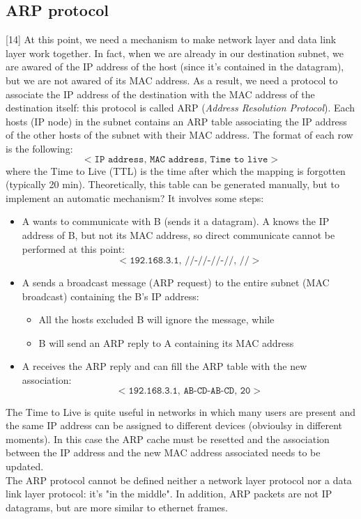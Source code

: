 \subsection{ARP protocol}
[14] At this point, we need a mechanism to make network layer and data link layer work together. In fact, when we are already in our destination subnet, we are awared of the IP address of the host (since it's contained in the datagram), but we are not awared of its MAC address. As a result, we need a protocol to associate the IP address of the destination with the MAC address of the destination itself: this protocol is called ARP (\textit{Address Resolution Protocol}). Each hosts (IP node) in the subnet contains an ARP table associating the IP address of the other hosts of the subnet with their MAC address. The format of each row is the following:
\[<\texttt{IP address, MAC address, Time to live}>\]
where the Time to Live (TTL) is the time after which the mapping is forgotten (typically 20 min). Theoretically, this table can be generated manually, but to implement an automatic mechanism? It involves some steps:
\begin{itemize}
    \item A wants to communicate with B (sends it a datagram). A knows the IP address of B, but not its MAC address, so direct communicate cannot be performed at this point:
    \[<\texttt{192.168.3.1, //-//-//-//, //}>\]
    \item A sends a broadcast message (ARP request) to the entire subnet (MAC broadcast) containing the B's IP address:
    \begin{itemize}
        \item All the hosts excluded B will ignore the message, while
        \item B will send an ARP reply to A containing its MAC address
    \end{itemize}
    \item A receives the ARP reply and can fill the ARP table with the new association:
    \[<\texttt{192.168.3.1, AB-CD-AB-CD, 20}>\]
\end{itemize}

\noindent The Time to Live is quite useful in networks in which many users are present and the same IP address can be assigned to different devices (obvioulsy in different moments). In this case the ARP cache must be resetted and the association between the IP address and the new MAC address associated needs to be updated.\\The ARP protocol cannot be defined neither a network layer protocol nor a data link layer protocol: it's "in the middle". In addition, ARP packets are not IP datagrams, but are more similar to ethernet frames.

